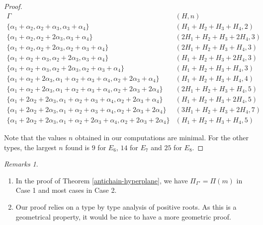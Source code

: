 \documentclass{amsart}
\theoremstyle{definition}
\theoremstyle{remark}
\newtheorem{remarks}[theorem]{Remarks}
\numberwithin{equation}{section}
\begin{document}
\begin{proof}
{\scriptsize$$
\begin{array}{c|c}
\Gamma & ( H , n ) \\ 
\hline \hline
\{ \alpha_{1}+\alpha_{2} , \alpha_{2}+\alpha_{3} , \alpha_{3}+\alpha_{4} \}
& ( H_{1}+H_{2}+H_{3}+H_{4} , 2 ) \\
\hline 
\{ \alpha_{1}+\alpha_{2} , \alpha_{2}+2\alpha_{3} ,\alpha_{3}+\alpha_{4} \}
& (2H_{1} + H_{2} + H_{3}+2H_{4} , 3)  \\ 
\hline 
\{ \alpha_{1}+\alpha_{2} , \alpha_{2}+2\alpha_{3} ,\alpha_{2}+\alpha_{3}+\alpha_{4} \}
& (2H_{1} + H_{2} + H_{3}+H_{4} , 3) \\
\hline 
\{ \alpha_{1}+\alpha_{2}+\alpha_{3} , \alpha_{2}+2\alpha_{3} , \alpha_{3}+\alpha_{4} \}
& (H_{1} + H_{2}+ H_{3}+2H_{4} , 3) \\
\hline 
\{ \alpha_{1}+\alpha_{2}+\alpha_{3} , \alpha_{2}+2\alpha_{3} ,\alpha_{2}+\alpha_{3}+\alpha_{4} \} 
& (H_{1}+H_{2}+H_{3}+H_{4} , 3) \\
\hline 
\{ \alpha_{1}+\alpha_{2}+2\alpha_{3} , \alpha_{1}+\alpha_{2}+\alpha_{3}+\alpha_{4} ,
\alpha_{2}+2\alpha_{3}+\alpha_{4} \} & (H_{1}+H_{2}+H_{3}+H_{4} , 4) \\ 
\hline 
\{ \alpha_{1}+\alpha_{2}+2\alpha_{3} , \alpha_{1}+\alpha_{2}+\alpha_{3}+\alpha_{4} ,
\alpha_{2}+2\alpha_{3}+2\alpha_{4} \} & ( 2H_{1} + H_{2}+H_{3}+H_{4}, 5) \\
\hline 
\{ \alpha_{1}+2\alpha_{2}+2\alpha_{3} , \alpha_{1}+\alpha_{2}+\alpha_{3}+\alpha_{4} ,
\alpha_{2}+2\alpha_{3}+\alpha_{4} \} & (H_{1}+H_{2}+H_{3}+2H_{4} , 5) \\ 
\hline 
\{ \alpha_{1}+2\alpha_{2}+2\alpha_{3} , \alpha_{1}+\alpha_{2}+\alpha_{3}+\alpha_{4} ,
\alpha_{2}+2\alpha_{3}+2\alpha_{4} \} & (3H_{1} +H_{2}+H_{3}+2H_{4} , 7) \\ 
\hline 
\{ \alpha_{1}+2\alpha_{2}+2\alpha_{3} , \alpha_{1}+\alpha_{2}+2\alpha_{3}+\alpha_{4} ,
\alpha_{2}+2\alpha_{3}+2\alpha_{4} \} & (H_{1}+H_{2}+H_{3}+H_{4} , 5) 
\end{array}
$$}

\noindent Note that the values $n$ obtained in our computations are minimal. For the other types, 
the largest $n$ found is $9$ for $E_{6}$, $14$ for $E_{7}$ and $25$ for $E_{8}$.
\end{proof}

\begin{remarks}
\begin{enumerate}
\item In the proof of Theorem \ref{antichain-hyperplane}, we have $\Pi_{\Gamma'} =\Pi (m)$ in Case 1 
and most cases in Case 2.
\item Our proof relies on a type by type analysis of positive roots. As this is a geometrical property,
it would be nice to have a more geometric proof.
\end{enumerate}
\end{remarks}
\end{document}
